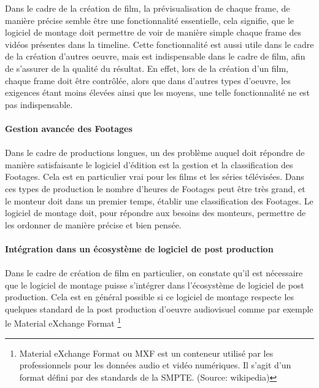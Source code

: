 Dans le cadre de la création de film, la prévisualisation de chaque frame,
de manière précise semble être une fonctionnalité essentielle,
cela signifie, que le logiciel de montage doit permettre de
voir de manière simple chaque frame des vidéos présentes dans la
timeline. Cette fonctionnalité est aussi utile dans le cadre de
la création d'autres oeuvre, mais est indispensable dans le cadre
de film, afin de s'assurer de la qualité du résultat. En effet,
lors de la création d'un film, chaque frame doit être contrôlée,
alors que dans d'autres types d'oeuvre, les exigences étant moins
élevées ainsi que les moyens, une telle fonctionnalité ne est pas
indispensable.

\paragraph{Gestion avancée des Footages}
\paragraph{}
Dans le cadre de productions longues, un des problème auquel doit répondre de
manière satisfaisante le logiciel d'édition est la gestion et la classification
des Footages. Cela est en particulier vrai pour les films et les séries télévisées.
Dans ces types de production le nombre d'heures de Footages peut être très grand, et
le monteur doit dans un premier temps, établir une classification
des Footages. Le logiciel de montage doit, pour répondre aux besoins des monteurs,
permettre de les ordonner de manière précise et bien pensée.

\paragraph{Intégration dans un écosystème de logiciel de post production}

\paragraph{}
Dans le cadre de création de film en particulier, on constate qu'il est nécessaire
que le logiciel de montage puisse s'intégrer dans l'écosystème de logiciel de post
production. Cela est en général possible si ce logiciel de montage respecte les
quelques standard de la post production d'oeuvre audiovisuel comme par exemple le
Material eXchange Format \footnote{Material eXchange Format ou MXF est un conteneur
utilisé par les professionnels pour les données audio et vidéo numériques.
Il s'agit d'un format défini par des standards de la SMPTE. (Source: wikipedia)}

